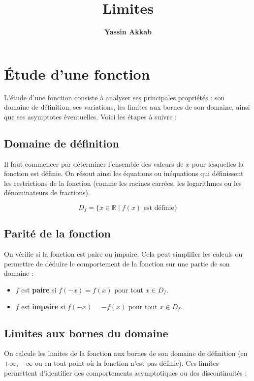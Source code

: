 \documentclass{article}
\title{\textbf{Limites}}
\author{\textbf{Yassin Akkab}}
\begin{document}
	
	\maketitle
	
	
	
	\tableofcontents
	
	\newpage
	\section{Étude d'une fonction}
	
	L'étude d'une fonction consiste à analyser ses principales propriétés : son domaine de définition, ses variations, les limites aux bornes de son domaine, ainsi que ses asymptotes éventuelles. Voici les étapes à suivre :
	
	\subsection{Domaine de définition}
	
	Il faut commencer par déterminer l'ensemble des valeurs de \( x \) pour lesquelles la fonction est définie. On résout ainsi les équations ou inéquations qui définissent les restrictions de la fonction (comme les racines carrées, les logarithmes ou les dénominateurs de fractions).
	
	\[
	D_f = \{x \in \mathbb{R} \mid f(x) \text{ est définie} \}
	\]
	
	\subsection{Parité de la fonction}
	
	On vérifie si la fonction est paire ou impaire. Cela peut simplifier les calculs ou permettre de déduire le comportement de la fonction sur une partie de son domaine :
	
	\begin{itemize}
		\item \( f \) est \textbf{paire} si \( f(-x) = f(x) \) pour tout \( x \in D_f \).
		\item \( f \) est \textbf{impaire} si \( f(-x) = -f(x) \) pour tout \( x \in D_f \).
	\end{itemize}
	
	\subsection{Limites aux bornes du domaine}
	
	On calcule les limites de la fonction aux bornes de son domaine de définition (en \( +\infty \), \( -\infty \) ou en tout point où la fonction n'est pas définie). Ces limites permettent d'identifier des comportements asymptotiques ou des discontinuités :
	
\end{document}

